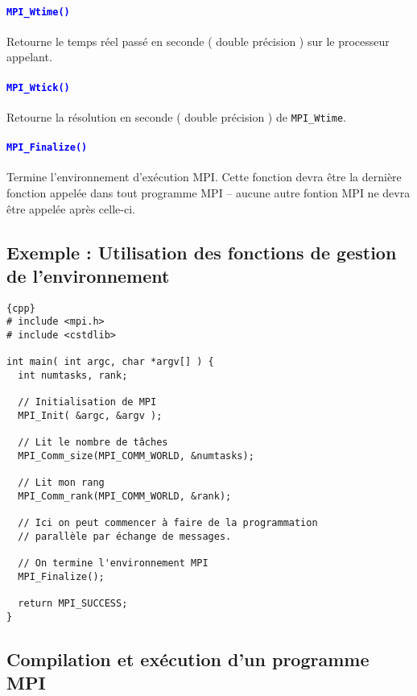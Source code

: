 \documentclass[11pt,a4paper]{article}
\begin{document}
\paragraph{\textcolor{blue}{\texttt{MPI\_Wtime()}}}

  Retourne le temps réel passé en seconde ( double précision ) sur le processeur appelant.

\paragraph{\textcolor{blue}{\texttt{MPI\_Wtick()}}}

  Retourne la résolution en seconde ( double précision ) de \texttt{MPI\_Wtime}.

\paragraph{\textcolor{blue}{\texttt{MPI\_Finalize()}}}

  Termine l'environnement d'exécution MPI. Cette fonction devra être la dernière fonction appelée dans tout programme MPI -- aucune autre fontion MPI ne devra être appelée après celle-ci.

\subsection{Exemple : Utilisation des fonctions de gestion de l'environnement}

\begin{lstlisting}{cpp}
# include <mpi.h>
# include <cstdlib>

int main( int argc, char *argv[] ) {
  int numtasks, rank;

  // Initialisation de MPI
  MPI_Init( &argc, &argv );

  // Lit le nombre de tâches
  MPI_Comm_size(MPI_COMM_WORLD, &numtasks);

  // Lit mon rang
  MPI_Comm_rank(MPI_COMM_WORLD, &rank);

  // Ici on peut commencer à faire de la programmation
  // parallèle par échange de messages.

  // On termine l'environnement MPI
  MPI_Finalize();

  return MPI_SUCCESS;	
}
\end{lstlisting}

\subsection{Compilation et exécution d'un programme MPI}
\end{document}

